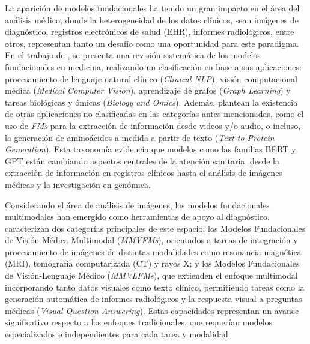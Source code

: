 La aparición de modelos fundacionales ha tenido un gran impacto en el área del análisis médico, donde la 
heterogeneidad de los datos clínicos, sean imágenes de diagnóstico, registros electrónicos de salud (EHR),
informes radiológicos, entre otros, representan tanto un desafío como una oportunidad para este paradigma. 
En el trabajo de \textcite{Khan2026}, se presenta una revisión sistemática de los modelos fundacionales en medicina,
realizando un clasificación en base a sus aplicaciones: procesamiento de lenguaje natural clínico (\textit{Clinical NLP}), 
visión computacional médica (\textit{Medical Computer Vision}), aprendizaje de grafos (\textit{Graph Learning}) y 
tareas biológicas y ómicas (\textit{Biology and Omics}). Además, plantean la existencia de otras aplicaciones no clasificadas
en las categorías antes mencionadas, como el uso de \textit{FMs} para la extracción de información desde videos y/o audio, o incluso,
la generación de aminoácidos a medida a partir de texto (\textit{Text-to-Protein Generation}). 
Esta taxonomía evidencia que modelos como las familias BERT y GPT están cambiando aspectos centrales 
de la atención sanitaria, desde la extracción de información en registros clínicos hasta el análisis de 
imágenes médicas y la investigación en genómica.

Considerando el área de análisis de imágenes, los modelos fundacionales multimodales han emergido como
herramientas de apoyo al diagnóstico. \textcite{SUN2025103265} caracterizan dos categorías principales de este espacio:
los Modelos Fundacionales de Visión Médica Multimodal
(\textit{MMVFMs}), orientados a tareas de integración y procesamiento de
imágenes de distintas modalidades como resonancia magnética (MRI), tomografía
computarizada (CT) y rayos X; y los Modelos Fundacionales de Visión-Lenguaje
Médico (\textit{MMVLFMs}), que extienden el enfoque multimodal incorporando
tanto datos visuales como texto clínico, permitiendo tareas como la generación
automática de informes radiológicos y la respuesta visual a preguntas médicas
(\textit{Visual Question Answering}). Estas capacidades representan un avance
significativo respecto a los enfoques tradicionales, que requerían modelos
especializados e independientes para cada tarea y modalidad.

